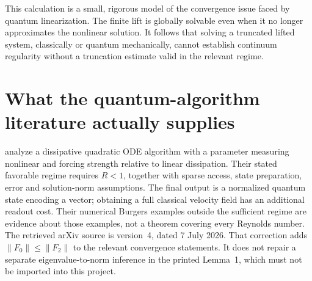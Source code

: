 This calculation is a small, rigorous model of the convergence issue faced by quantum linearization. The finite lift is globally solvable even when it no longer approximates the nonlinear solution. It follows that solving a truncated lifted system, classically or quantum mechanically, cannot establish continuum regularity without a truncation estimate valid in the relevant regime.

\section{What the quantum-algorithm literature actually supplies}

\citet{NSLiu2021} analyze a dissipative quadratic ODE algorithm with a parameter measuring nonlinear and forcing strength relative to linear dissipation. Their stated favorable regime requires $R<1$, together with sparse access, state preparation, error and solution-norm assumptions. The final output is a normalized quantum state encoding a vector; obtaining a full classical velocity field has an additional readout cost. Their numerical Burgers examples outside the sufficient regime are evidence about those examples, not a theorem covering every Reynolds number. The retrieved arXiv source is version~4, dated 7 July 2026. That correction adds $\|F_0\|\le\|F_2\|$ to the relevant convergence statements. It does not repair a separate eigenvalue-to-norm inference in the printed Lemma~1, which must not be imported into this project.

